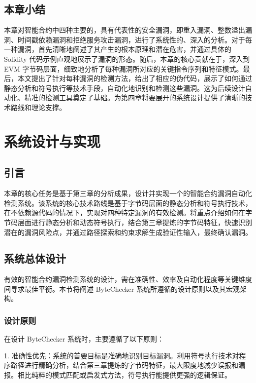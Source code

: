 \documentclass[print, master, vlined, timesmath]{DissertUESTC}
\begin{document}
\section{本章小结}

本章对智能合约中四种主要的，具有代表性的安全漏洞，即重入漏洞、整数溢出漏洞、时间戳依赖漏洞和拒绝服务攻击漏洞，进行了系统性的、深入的分析。对于每一种漏洞，首先清晰地阐述了其产生的根本原理和潜在危害，并通过具体的 Solidity 代码示例直观地展示了漏洞的形态。随后，本章的核心贡献在于，深入到 EVM 字节码层面，细致地分析了每种漏洞所对应的关键指令序列和特征模式。最后，本文提出了针对每种漏洞的检测方法，给出了相应的伪代码，展示了如何通过静态分析和符号执行等技术手段，自动化地识别和检测这些漏洞。这为后续设计自动化、精准的检测工具奠定了基础。为第四章将要展开的系统设计提供了清晰的技术路线和理论支撑。

\chapter{系统设计与实现}

\section{引言}

本章的核心任务是基于第三章的分析成果，设计并实现一个的智能合约漏洞自动化检测系统。该系统的核心技术路线是基于字节码层面的静态分析和符号执行技术，在不依赖源代码的情况下，实现对四种特定漏洞的有效检测。将重点介绍如何在字节码层面进行静态分析和动态符号执行，结合第三章提炼的字节码特征，快速识别潜在的漏洞风险点，并通过路径探索和约束求解生成验证性输入，最终确认漏洞。

\section{系统总体设计}


有效的智能合约漏洞检测系统的设计，需在准确性、效率及自动化程度等关键维度间寻求最佳平衡。本节将阐述 ByteChecker 系统所遵循的设计原则以及其宏观架构。

\subsection{设计原则}

在设计 ByteChecker 系统时，主要遵循了以下原则：

1. 准确性优先：系统的首要目标是准确地识别目标漏洞。利用符号执行技术对程序路径进行精确分析，结合第三章提炼的字节码特征，最大限度地减少误报和漏报。相比纯粹的模式匹配或启发式方法，符号执行能提供更强的逻辑保证。
\end{document}
